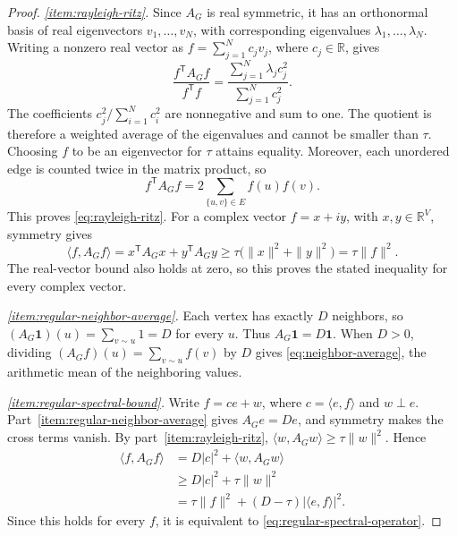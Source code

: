 \documentclass[11pt,a4paper]{article}
\numberwithin{equation}{section}
\numberwithin{figure}{section}
\numberwithin{table}{section}
\numberwithin{footnote}{section}
\theoremstyle{informal}\newtheorem*{informaltheorem}{Informal theorem}
\theoremstyle{definition}\newtheorem{example}{Example}[section]
\theoremstyle{remark}\newtheorem{remark}[theorem]{Remark}
\newcommand{\one}{\mathbf 1}
\begin{document}
\begin{proof}
\emph{\ref{item:rayleigh-ritz}.}
Since \(A_G\) is real symmetric, it has an orthonormal basis of real
eigenvectors \(v_1,\ldots,v_N\), with corresponding eigenvalues
\(\lambda_1,\ldots,\lambda_N\). Writing a nonzero real vector as
\(f=\sum_{j=1}^N c_jv_j\), where \(c_j\in\mathbb R\), gives
\begin{equation}\label{eq:rayleigh-weighted-average}
 \frac{f^{\mathsf T}A_Gf}{f^{\mathsf T}f}
 =\frac{\sum_{j=1}^N\lambda_jc_j^2}{\sum_{j=1}^Nc_j^2}.
\end{equation}
The coefficients \(c_j^2/\sum_{i=1}^Nc_i^2\) are nonnegative
and sum to one. The quotient is therefore a weighted average of
the eigenvalues and cannot be smaller than \(\tau\). Choosing
\(f\) to be an eigenvector for \(\tau\) attains equality.
Moreover, each unordered edge is counted twice in the matrix product,
so
\begin{equation}
 f^{\mathsf T}A_Gf=2\sum_{\{u,v\}\in E}f(u)f(v).
\end{equation}
This proves \eqref{eq:rayleigh-ritz}. For a complex vector
\(f=x+iy\), with \(x,y\in\mathbb R^V\), symmetry gives
\begin{equation}
 \langle f,A_Gf\rangle
 =x^{\mathsf T}A_Gx+y^{\mathsf T}A_Gy
 \geq\tau\bigl(\|x\|^2+\|y\|^2\bigr)
 =\tau\|f\|^2.
\end{equation}
The real-vector bound also holds at zero, so this proves the stated
inequality for every complex vector.

\emph{\ref{item:regular-neighbor-average}.}
Each vertex has exactly \(D\) neighbors, so
\((A_G\one)(u)=\sum_{v\sim u}1=D\) for every \(u\).
Thus \(A_G\one=D\one\). When \(D>0\), dividing
\((A_Gf)(u)=\sum_{v\sim u}f(v)\) by \(D\) gives
\eqref{eq:neighbor-average}, the arithmetic mean of the neighboring
values.

\emph{\ref{item:regular-spectral-bound}.}
Write \(f=ce+w\), where \(c=\langle e,f\rangle\) and
\(w\perp e\). Part~\ref{item:regular-neighbor-average} gives
\(A_Ge=De\), and symmetry makes the cross terms vanish.
By part~\ref{item:rayleigh-ritz},
\(\langle w,A_Gw\rangle\geq\tau\|w\|^2\). Hence
\begin{equation}
 \begin{aligned}
  \langle f,A_Gf\rangle
  &=D|c|^2+\langle w,A_Gw\rangle\\
  &\geq D|c|^2+\tau\|w\|^2\\
  &=\tau\|f\|^2+(D-\tau)|\langle e,f\rangle|^2.
 \end{aligned}
\end{equation}
Since this holds for every \(f\), it is equivalent to
\eqref{eq:regular-spectral-operator}.
\end{proof}
\end{document}
